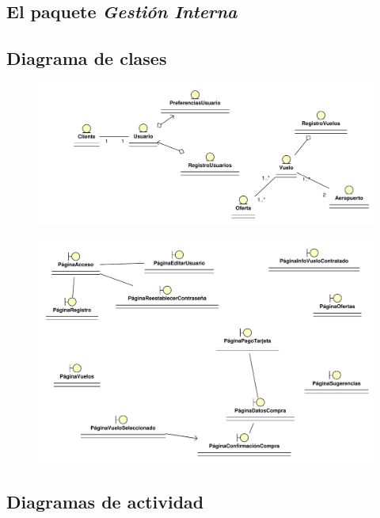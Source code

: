 \documentclass[11pt, a4paper, twoside, titlepage]{article}
\begin{document}
\begin{landscape}
	\section{El paquete {\itshape Gestión Interna}}
		\subsection{Diagrama de clases}

			\begin{figure}[H]\centering
				\vspace{2cm}
				\hspace{-2cm}
				\includegraphics[scale=1]{diagramas/diagramaclases.pdf}
			\end{figure}		
\end{landscape}
\begin{landscape}
			\begin{figure}[H]\centering
				\includegraphics[scale=1]{diagramas/sitioweb.pdf}
			\end{figure}
\end{landscape}

		\subsection{Diagramas de actividad}
\end{document}
